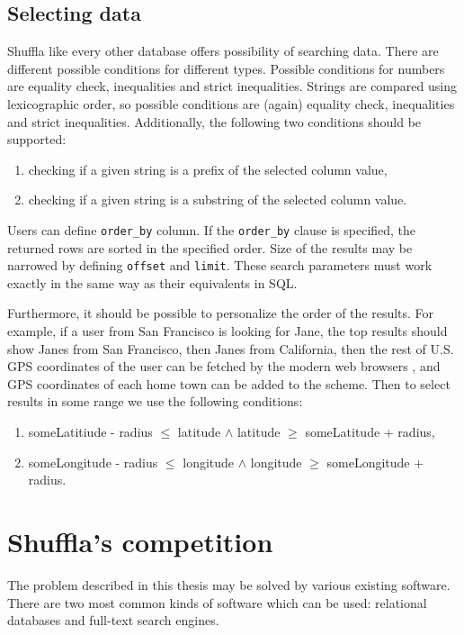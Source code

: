 \documentclass[10pt,a4paper]{article}
\begin{document}
\subsection{Selecting data}

Shuffla like every other database offers possibility of searching data. There are different possible conditions for different types. Possible conditions for numbers are equality check, inequalities and strict inequalities. Strings are compared using lexicographic order, so possible conditions are (again) equality check, inequalities and strict inequalities. Additionally, the following two conditions should be supported:
\begin{enumerate}
\item checking if a given string is a prefix of the selected column value,
\item checking if a given string is a substring of the selected column value. 
\end{enumerate}

Users can define \verb|order_by| column. If the \verb|order_by| clause is specified, the returned rows are sorted in the specified order. Size of the results may be narrowed by defining \verb|offset| and \verb|limit|. These search parameters must work exactly in the same way as their equivalents in SQL.

Furthermore, it should be possible to personalize the order of the results. For example, if a user from San Francisco is looking for Jane, the top results should show Janes from San Francisco, then Janes from California, then the rest of U.S. GPS coordinates of the user can be fetched by the modern web browsers \cite{FETCHGPS}, and GPS coordinates of each home town can be added to the scheme. Then to select results in some range we use the following conditions:   
\begin{enumerate}
\item{someLatitiude - radius $\leq$ latitude $\wedge$ latitude $\geq$ someLatitude + radius},
\item{someLongitude - radius $\leq$ longitude $\wedge$ longitude $\geq$ someLongitude + radius}.
\end{enumerate}

\section{Shuffla's competition}
The problem described in this thesis may be solved by various existing software. There are two most common kinds of software which can be used: relational databases and full-text search engines.
\end{document}
